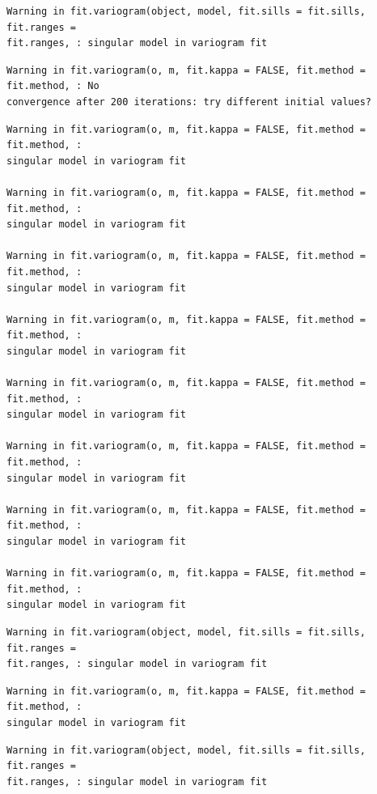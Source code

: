 \documentclass[
  letterpaper,
  DIV=11,
  numbers=noendperiod]{scrartcl}
\begin{document}
\begin{verbatim}
Warning in fit.variogram(object, model, fit.sills = fit.sills, fit.ranges =
fit.ranges, : singular model in variogram fit
\end{verbatim}

\begin{verbatim}
Warning in fit.variogram(o, m, fit.kappa = FALSE, fit.method = fit.method, : No
convergence after 200 iterations: try different initial values?
\end{verbatim}

\begin{verbatim}
Warning in fit.variogram(o, m, fit.kappa = FALSE, fit.method = fit.method, :
singular model in variogram fit

Warning in fit.variogram(o, m, fit.kappa = FALSE, fit.method = fit.method, :
singular model in variogram fit

Warning in fit.variogram(o, m, fit.kappa = FALSE, fit.method = fit.method, :
singular model in variogram fit

Warning in fit.variogram(o, m, fit.kappa = FALSE, fit.method = fit.method, :
singular model in variogram fit

Warning in fit.variogram(o, m, fit.kappa = FALSE, fit.method = fit.method, :
singular model in variogram fit

Warning in fit.variogram(o, m, fit.kappa = FALSE, fit.method = fit.method, :
singular model in variogram fit

Warning in fit.variogram(o, m, fit.kappa = FALSE, fit.method = fit.method, :
singular model in variogram fit

Warning in fit.variogram(o, m, fit.kappa = FALSE, fit.method = fit.method, :
singular model in variogram fit
\end{verbatim}

\begin{verbatim}
Warning in fit.variogram(object, model, fit.sills = fit.sills, fit.ranges =
fit.ranges, : singular model in variogram fit
\end{verbatim}

\begin{verbatim}
Warning in fit.variogram(o, m, fit.kappa = FALSE, fit.method = fit.method, :
singular model in variogram fit
\end{verbatim}

\begin{verbatim}
Warning in fit.variogram(object, model, fit.sills = fit.sills, fit.ranges =
fit.ranges, : singular model in variogram fit
\end{verbatim}
\end{document}
